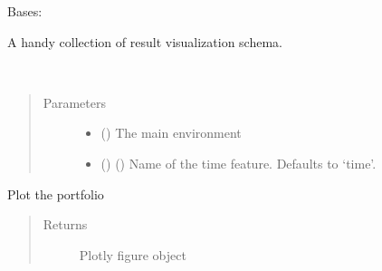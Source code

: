 \documentclass[letterpaper,10pt,english]{sphinxmanual}
\begin{document}
\begin{fulllineitems}
\label{\detokenize{Visualizer:crypto_env.visualizer.Visualizer}}
\sphinxAtStartPar
Bases: 

\sphinxAtStartPar
A handy collection of result visualization schema.

\begin{fulllineitems}
\label{\detokenize{Visualizer:crypto_env.visualizer.Visualizer.__init__}}~\begin{quote}\begin{description}
\item[{Parameters}] \leavevmode\begin{itemize}
\item {} 
\sphinxAtStartPar
{} () \textendash{} The main environment

\item {} 
\sphinxAtStartPar
{} (\sphinxstyleliteralemphasis{\sphinxupquote{, }}) \textendash{} () Name of the time feature. Defaults to ‘time’.

\end{itemize}

\end{description}\end{quote}

\end{fulllineitems}


\begin{fulllineitems}
\label{\detokenize{Visualizer:crypto_env.visualizer.Visualizer.draw_portfolio}}
\sphinxAtStartPar
Plot the portfolio
\begin{quote}\begin{description}
\item[{Returns}] \leavevmode
\sphinxAtStartPar
Plotly figure object


\end{description}
\end{quote}
\end{fulllineitems}
\end{fulllineitems}
\end{document}
